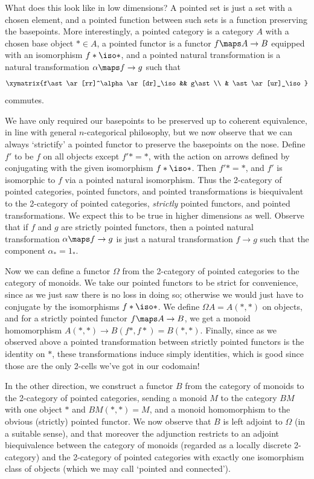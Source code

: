 \documentclass[12pt]{amsart}
\begin{document}
What does this look like in low dimensions?  A pointed set is just a
set with a chosen element, and a pointed function between such sets is
a function preserving the basepoints.  More interestingly, a pointed
category is a category $A$ with a chosen base object $*\in A$, a
pointed functor is a functor $f\maps A\to B$ equipped with an
isomorphism $f*\iso *$, and a pointed natural transformation is a
natural transformation $\alpha\maps f\to g$ such that
\[\xymatrix{f\ast \ar[rr]^\alpha \ar[dr]_\iso && g\ast\\ & \ast\ar[ur]_\iso}\]
commutes.

We have only required our basepoints to be preserved up to coherent
equivalence, in line with general $n$-categorical philosophy, but we
now observe that we can always `strictify' a pointed functor to
preserve the basepoints on the nose.  Define $f'$ to be $f$ on all
objects except $f'*=*$, with the action on arrows defined by
conjugating with the given isomorphism $f*\iso *$.  Then $f'*=*$, and
$f'$ is isomorphic to $f$ via a pointed natural isomorphism.  Thus the
2-category of pointed categories, pointed functors, and pointed
transformations is biequivalent to the 2-category of pointed
categories, \emph{strictly} pointed functors, and pointed
transformations.  We expect this to be true in higher dimensions as
well.  Observe that if $f$ and $g$ are strictly pointed functors, then
a pointed natural transformation $\alpha\maps f\to g$ is just a
natural transformation $f\to g$ such that the component $\alpha_* =
1_*$.

Now we can define a functor $\Omega$ from the 2-category of pointed
categories to the category of monoids.  We take our pointed functors
to be strict for convenience, since as we just saw there is no loss in
doing so; otherwise we would just have to conjugate by the
isomorphisms $f*\iso *$.  We define $\Omega A = A(*,*)$ on objects,
and for a strictly pointed functor $f\maps A\to B$, we get a monoid
homomorphism $A(*,*)\to B(f*,f*) = B(*,*)$.  Finally, since as we
observed above a pointed transformation between strictly pointed
functors is the identity on $*$, these transformations induce simply
identities, which is good since those are the only 2-cells we've got
in our codomain!

In the other direction, we construct a functor $B$ from the category
of monoids to the 2-category of pointed categories, sending a monoid
$M$ to the category $BM$ with one object $*$ and $BM(*,*)=M$, and a
monoid homomorphism to the obvious (strictly) pointed functor.  We now
observe that $B$ is left adjoint to $\Omega$ (in a suitable sense),
and that moreover the adjunction restricts to an adjoint biequivalence
between the category of monoids (regarded as a locally discrete
2-category) and the 2-category of pointed categories with exactly one
isomorphism class of objects (which we may call `pointed and
connected').
\end{document}
